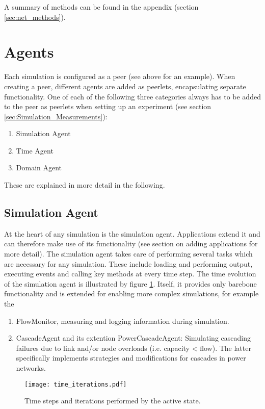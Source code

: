 \documentclass[11pt,fleqn]{book} %
\newcommand{\mainagent}{simulation agent }
\newcommand{\MainAgent}{Simulation Agent }
\newcommand{\TimeAgent}{Time Agent }
\newcommand{\DomainAgent}{Domain Agent }
\begin{document}
A summary of methods can be found in the appendix (section \ref{sec:net_methods}).

\section{Agents}\label{sec:agents}
Each simulation is configured as a peer (see above for an example). When creating a peer, different agents are added as peerlets, encapsulating separate functionality. One of each of the following three categories always has to be added to the peer as peerlets when setting up an experiment (see section \ref{sec:Simulation_Measurements}):
\begin{enumerate}
	\item \MainAgent
	\item \TimeAgent
	\item \DomainAgent
\end{enumerate}
These are explained in more detail in the following.

\subsection{Simulation Agent}\label{sec:simu_agent}
At the heart of any simulation is the simulation agent. Applications extend it and can therefore make use of its functionality (see section on adding applications for more detail). The \mainagent takes care of performing several tasks which are necessary for any simulation. These include loading and performing output, executing events and calling key methods at every time step. The time evolution of the simulation agent is illustrated by figure \ref{fig:time_iter}. Itself, it provides only barebone functionality and is extended for enabling more complex simulations, for example the
	\begin{enumerate}
		\item FlowMonitor, measuring and logging information during simulation.
		\item CascadeAgent and its extention PowerCascadeAgent: Simulating cascading failures due to link and/or node overloads (i.e. capacity < flow). The latter specifically implements strategies and modifications for cascades in power networks.
	\end{enumerate}

\begin{figure}[!h]
\centering\texttt{[image: time\_iterations.pdf]}
\caption{Time steps and iterations performed by the active state.}
\label{fig:time_iter}
\end{figure}
\end{document}

